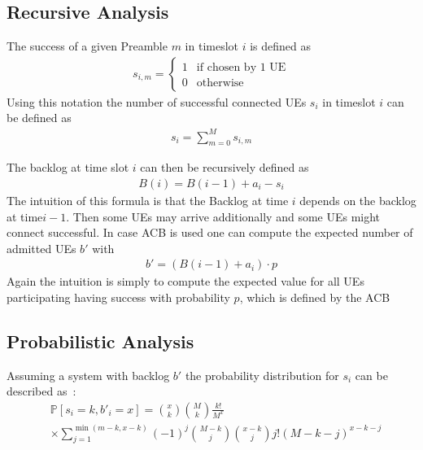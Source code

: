 \documentclass[conference]{IEEEtran}
\begin{document}
\subsection{Recursive Analysis}\label{deterministic}
The success of a given Preamble $m$ in timeslot $i$ is defined as
\begin{align}
    s_{i,m}= \begin{cases}
                       1& \text{if chosen by 1 UE}\\
                       0 &\text{otherwise}
        \end{cases}
\end{align}
Using this notation the number of successful connected UEs $s_i$ in timeslot $i$ can be defined as
\begin{align}
    s_i = \sum_{m = 0}^M s_{i,m}
\end{align}


The backlog at time slot $i$ can then be recursively defined as
\begin{align}
    B(i) = B(i-1)+a_i-s_i
\end{align}
The intuition of this formula is that the Backlog at time $i$ depends on the backlog at time$i-1$.
Then some UEs may arrive additionally and some UEs might connect successful.
In case ACB is used one can compute the expected number of admitted UEs $b'$ with
\begin{align}
  b'= (B(i-1)+a_i)\cdot p
\end{align}
Again the intuition is simply to compute the expected value for all UEs participating having success with probability $p$, which is defined by the ACB
\subsection{Probabilistic Analysis}
Assuming a system with backlog $b'$ the probability distribution for $s_i$ can be described as~\cite{8422323}:
\begin{align}
    &\mathds{P}[s_i = k, b'_i = x]= \binom{x}{k}\binom{M}{k}\frac{k!}{M^x}\\
    &\times\sum_{j= 1}^{\min(m-k, x-k)} (-1)^j\binom{M-k}{j}\binom{x-k}{j}j! (M-k-j)^{x-k-j}
\end{align}
\end{document}
